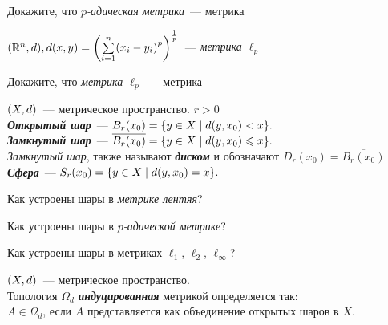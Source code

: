 \documentclass{article}
\begin{document}
    \begin{task_boxed}
        Докажите, что \textit{$p$-адическая метрика}~--- метрика
    \end{task_boxed}

    \begin{example}
        $\lr*{\R^n, d}, d(x, y) = \lr*{\sum\limits_{i=1}^{n}\lr*{x_i - y_i}^p}^{\frac{1}{p}}$~---
        \textit{метрика $\ell_p$}
    \end{example}


    \begin{task_boxed}
        Докажите, что \textit{метрика $\ell_p$}~--- метрика
    \end{task_boxed}


    \begin{definition_boxed}
        $\lr*{X, d}$~--- метрическое пространство. $r > 0$\\
        \textbf{\textit{Открытый шар}}~--- $B_r(x_0) = \set*{y \in X \mid d(y, x_0) < x}.$\\
        \textbf{\textit{Замкнутый шар}}~--- $\overline{B_r(x_0)} = \set*{y \in X \mid d(y, x_0) \leqslant x}.$\\
        \textit{Замкнутый шар}, также называют \textbf{\textit{диском}} и обозначают $D_r(x_0) = \overline{B_r(x_0)}$\\
        \textbf{\textit{Сфера}}~--- $S_r(x_0) = \set*{y \in X \mid d(y, x_0) = x}.$\\
    \end{definition_boxed}

    \begin{task_boxed}
        Как устроены шары в \textit{метрике лентяя}?
    \end{task_boxed}

    \begin{task_boxed}
        Как устроены шары в \textit{$p$-адической метрике}?
    \end{task_boxed}

    \begin{task_boxed}
        Как устроены шары в метриках $\ell_1$, $\ell_{2}$, $\ell_\infty$?
    \end{task_boxed}

    \begin{definition_boxed}
        $\lr*{X, d}$~--- метрическое пространство.\\
        Топология $\Omega_d$ \textbf{\textit{индуцированная}} метрикой определяется так:\\
        $A \in \Omega_d$, если $A$ представляется как объединение открытых шаров в $X$.
    \end{definition_boxed}
\end{document}
